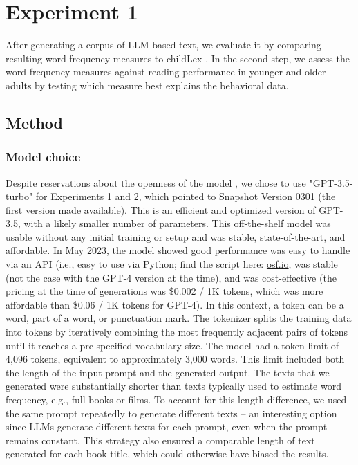 \documentclass[doc, a4paper, anonymous]{apa7}
\begin{document}
\section{Experiment 1}

After generating a corpus of LLM-based text, we evaluate it by comparing resulting word frequency measures to childLex \citep{schroeder_childlex_2015}. In the second step, we assess the word frequency measures against reading performance \citep{schroter_developmental_2017} in younger and older adults by testing which measure best explains the behavioral data. 

\subsection{Method}

\subsubsection*{Model choice}

Despite reservations about the openness of the model \citep[see, e.g., ][]{liesenfeld_opening_2023, hussain_tutorial_2024}, we chose to use "GPT-3.5-turbo" for Experiments 1 and 2, which pointed to Snapshot Version 0301 (the first version made available). This is an efficient and optimized version of GPT-3.5, with a likely smaller number of parameters. This off-the-shelf model was usable without any initial training or setup and was stable, state-of-the-art, and affordable. In May 2023, the model showed good performance was easy to handle via an API (i.e., easy to use via Python; find the script here: \href{dx.doi.org/10.17605/OSF.IO/WMUVJ}{osf.io}, was stable (not the case with the GPT-4 version at the time), and was cost-effective (the pricing at the time of generations was \$0.002 / 1K tokens, which was more affordable than \$0.06 / 1K tokens for GPT-4). In this context, a token can be a word, part of a word, or punctuation mark. The tokenizer splits the training data into tokens by iteratively combining the most frequently adjacent pairs of tokens until it reaches a pre-specified vocabulary size. The model had a token limit of 4,096 tokens, equivalent to approximately 3,000 words. This limit included both the length of the input prompt and the generated output. The texts that we generated were substantially shorter than texts typically used to estimate word frequency, e.g., full books or films. To account for this length difference, we used the same prompt repeatedly to generate different texts – an interesting option since LLMs generate different texts for each prompt, even when the prompt remains constant. This strategy also ensured a comparable length of text generated for each book title, which could otherwise have biased the results. 
\end{document}
